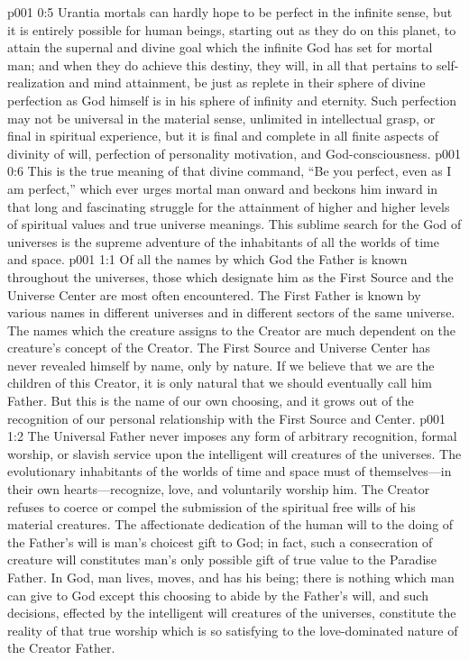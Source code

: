\vs p001 0:5 Urantia mortals can hardly hope to be perfect in the infinite sense, but it is entirely possible for human beings, starting out as they do on this planet, to attain the supernal and divine goal which the infinite God has set for mortal man; and when they do achieve this destiny, they will, in all that pertains to self\hyp{}realization and mind attainment, be just as replete in their sphere of divine perfection as God himself is in his sphere of infinity and eternity. Such perfection may not be universal in the material sense, unlimited in intellectual grasp, or final in spiritual experience, but it is final and complete in all finite aspects of divinity of will, perfection of personality motivation, and God\hyp{}consciousness.
\vs p001 0:6 This is the true meaning of that divine command, “Be you perfect, even as I am perfect,” which ever urges mortal man onward and beckons him inward in that long and fascinating struggle for the attainment of higher and higher levels of spiritual values and true universe meanings. This sublime search for the God of universes is the supreme adventure of the inhabitants of all the worlds of time and space.
\vs p001 1:1 Of all the names by which God the Father is known throughout the universes, those which designate him as the First Source and the Universe Center are most often encountered. The First Father is known by various names in different universes and in different sectors of the same universe. The names which the creature assigns to the Creator are much dependent on the creature’s concept of the Creator. The First Source and Universe Center has never revealed himself by name, only by nature. If we believe that we are the children of this Creator, it is only natural that we should eventually call him Father. But this is the name of our own choosing, and it grows out of the recognition of our personal relationship with the First Source and Center.
\vs p001 1:2 The Universal Father never imposes any form of arbitrary recognition, formal worship, or slavish service upon the intelligent will creatures of the universes. The evolutionary inhabitants of the worlds of time and space must of themselves---in their own hearts---recognize, love, and voluntarily worship him. The Creator refuses to coerce or compel the submission of the spiritual free wills of his material creatures. The affectionate dedication of the human will to the doing of the Father’s will is man’s choicest gift to God; in fact, such a consecration of creature will constitutes man’s only possible gift of true value to the Paradise Father. In God, man lives, moves, and has his being; there is nothing which man can give to God except this choosing to abide by the Father’s will, and such decisions, effected by the intelligent will creatures of the universes, constitute the reality of that true worship which is so satisfying to the love\hyp{}dominated nature of the Creator Father.
